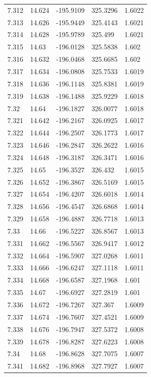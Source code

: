 \begin{tabular}{lllll}
7.312 & 14.624 & -195.9109 & 325.3296 & 1.6022 \\
7.313 & 14.626 & -195.9449 & 325.4143 & 1.6021 \\
7.314 & 14.628 & -195.9789 & 325.499 & 1.6021 \\
7.315 & 14.63 & -196.0128 & 325.5838 & 1.602 \\
7.316 & 14.632 & -196.0468 & 325.6685 & 1.602 \\
7.317 & 14.634 & -196.0808 & 325.7533 & 1.6019 \\
7.318 & 14.636 & -196.1148 & 325.8381 & 1.6019 \\
7.319 & 14.638 & -196.1488 & 325.9229 & 1.6018 \\
7.32 & 14.64 & -196.1827 & 326.0077 & 1.6018 \\
7.321 & 14.642 & -196.2167 & 326.0925 & 1.6017 \\
7.322 & 14.644 & -196.2507 & 326.1773 & 1.6017 \\
7.323 & 14.646 & -196.2847 & 326.2622 & 1.6016 \\
7.324 & 14.648 & -196.3187 & 326.3471 & 1.6016 \\
7.325 & 14.65 & -196.3527 & 326.432 & 1.6015 \\
7.326 & 14.652 & -196.3867 & 326.5169 & 1.6015 \\
7.327 & 14.654 & -196.4207 & 326.6018 & 1.6014 \\
7.328 & 14.656 & -196.4547 & 326.6868 & 1.6014 \\
7.329 & 14.658 & -196.4887 & 326.7718 & 1.6013 \\
7.33 & 14.66 & -196.5227 & 326.8567 & 1.6013 \\
7.331 & 14.662 & -196.5567 & 326.9417 & 1.6012 \\
7.332 & 14.664 & -196.5907 & 327.0268 & 1.6011 \\
7.333 & 14.666 & -196.6247 & 327.1118 & 1.6011 \\
7.334 & 14.668 & -196.6587 & 327.1968 & 1.601 \\
7.335 & 14.67 & -196.6927 & 327.2819 & 1.601 \\
7.336 & 14.672 & -196.7267 & 327.367 & 1.6009 \\
7.337 & 14.674 & -196.7607 & 327.4521 & 1.6009 \\
7.338 & 14.676 & -196.7947 & 327.5372 & 1.6008 \\
7.339 & 14.678 & -196.8287 & 327.6223 & 1.6008 \\
7.34 & 14.68 & -196.8628 & 327.7075 & 1.6007 \\
7.341 & 14.682 & -196.8968 & 327.7927 & 1.6007 \\

\end{tabular}
